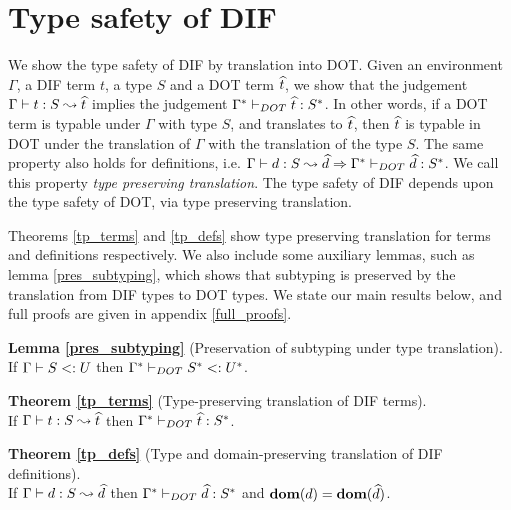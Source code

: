 \section{Type safety of DIF}

We show the type safety of DIF by translation into DOT. Given an environment
$\Gamma$, a DIF term $t$, a type $S$ and a DOT term $\widehat{t}$, we show that the
judgement $\Gamma \vdash t: S \leadsto \widehat{t}$ implies the judgement
$\Gamma^{*} \vdash_{DOT} \widehat{t}: S^{*}$. In other words, if a DOT term is
typable under $\Gamma$ with type $S$, and translates to $\widehat{t}$, then
$\widehat{t}$ is typable in DOT under the translation of $\Gamma$ with the
translation of the type $S$. The same property also holds for definitions, i.e.
$\Gamma \vdash d: S \leadsto \widehat{d} \Rightarrow
\Gamma^{*} \vdash_{DOT} \widehat{d}: S^{*}$. We call this property \emph{type
preserving translation}. The type safety of DIF depends upon the type safety of
DOT, via type preserving translation.

Theorems \ref{tp_terms} and \ref{tp_defs} show type preserving translation for
terms and definitions respectively. We also include some auxiliary lemmas, such
as lemma \ref{pres_subtyping}, which shows that subtyping is preserved by the
translation from DIF types to DOT types. We state our main results below, and full proofs are given in appendix \ref{full_proofs}.

\vspace{3mm}

\noindent \textbf{Lemma \ref{pres_subtyping}} (Preservation of subtyping under
type translation). \\
If $\Gamma \vdash S <: U$ then $\Gamma^{*} \vdash_{DOT} S^{*} <: U^{*}$.

\vspace{3mm}

\noindent \textbf{Theorem \ref{tp_terms}} (Type-preserving translation of DIF
terms). \\
If $\Gamma \vdash t: S \leadsto \widehat{t}$ then
$\Gamma^{*} \vdash_{DOT} \widehat{t}: S^{*}$.

\vspace{3mm}

\noindent \textbf{Theorem \ref{tp_defs}} (Type and domain-preserving
translation of DIF definitions). \\
If $\Gamma \vdash d: S \leadsto \widehat{d}$ then $\Gamma^{*} \vdash_{DOT} \widehat{d}: S^{*}$
and $\textbf{dom}(d) = \textbf{dom}(\widehat{d})$.

\vspace{3mm}
